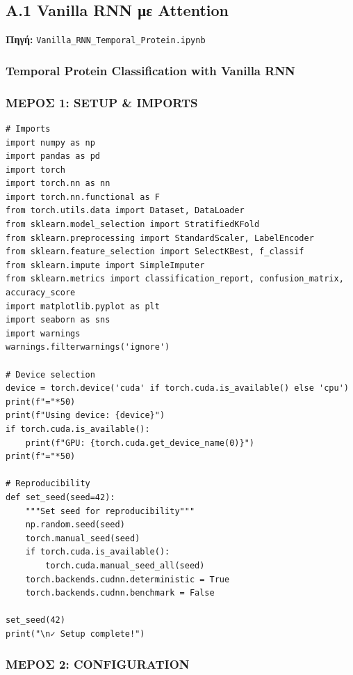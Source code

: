 \subsection{A.1 Vanilla RNN με Attention}
 
\noindent \textbf{Πηγή:} \texttt{Vanilla\_RNN\_Temporal\_Protein.ipynb}
 
 
\subsubsection*{Temporal Protein Classification with Vanilla RNN}
 
\subsubsection*{ΜΕΡΟΣ 1: SETUP \& IMPORTS}
 
\begin{lstlisting}
# Imports
import numpy as np
import pandas as pd
import torch
import torch.nn as nn
import torch.nn.functional as F
from torch.utils.data import Dataset, DataLoader
from sklearn.model_selection import StratifiedKFold
from sklearn.preprocessing import StandardScaler, LabelEncoder
from sklearn.feature_selection import SelectKBest, f_classif
from sklearn.impute import SimpleImputer
from sklearn.metrics import classification_report, confusion_matrix, accuracy_score
import matplotlib.pyplot as plt
import seaborn as sns
import warnings
warnings.filterwarnings('ignore')
 
# Device selection
device = torch.device('cuda' if torch.cuda.is_available() else 'cpu')
print(f"="*50)
print(f"Using device: {device}")
if torch.cuda.is_available():
    print(f"GPU: {torch.cuda.get_device_name(0)}")
print(f"="*50)
 
# Reproducibility
def set_seed(seed=42):
    """Set seed for reproducibility"""
    np.random.seed(seed)
    torch.manual_seed(seed)
    if torch.cuda.is_available():
        torch.cuda.manual_seed_all(seed)
    torch.backends.cudnn.deterministic = True
    torch.backends.cudnn.benchmark = False
 
set_seed(42)
print("\n✓ Setup complete!")
\end{lstlisting}
 
\subsubsection*{ΜΕΡΟΣ 2: CONFIGURATION}
 
